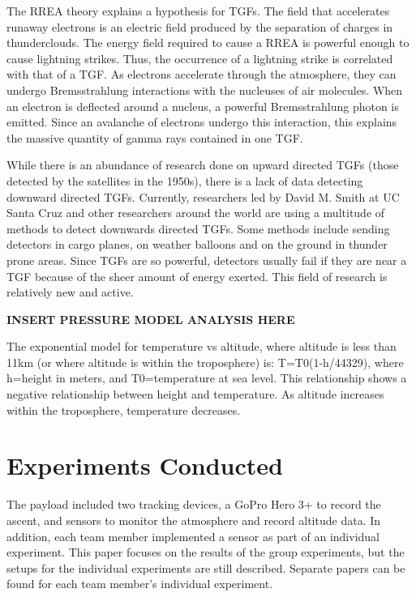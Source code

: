 \documentclass[12pt,]{article}
\begin{document}
The RREA theory explains a hypothesis for TGFs. The field that
accelerates runaway electrons is an electric field produced by the
separation of charges in thunderclouds. The energy field required to
cause a RREA is powerful enough to cause lightning strikes. Thus, the
occurrence of a lightning strike is correlated with that of a TGF. As
electrons accelerate through the atmosphere, they can undergo
Bremsstrahlung interactions with the nucleuses of air molecules. When an
electron is deflected around a nucleus, a powerful Bremsstrahlung photon
is emitted. Since an avalanche of electrons undergo this interaction,
this explains the massive quantity of gamma rays contained in one TGF.

While there is an abundance of research done on upward directed TGFs
(those detected by the satellites in the 1950s), there is a lack of data
detecting downward directed TGFs. Currently, researchers led by David M.
Smith at UC Santa Cruz and other researchers around the world are using
a multitude of methods to detect downwards directed TGFs. Some methods
include sending detectors in cargo planes, on weather balloons and on
the ground in thunder prone areas. Since TGFs are so powerful, detectors
usually fail if they are near a TGF because of the sheer amount of
energy exerted. This field of research is relatively new and active.

\textbf{INSERT PRESSURE MODEL ANALYSIS HERE}

The exponential model for temperature vs altitude, where altitude is
less than 11km (or where altitude is within the troposphere) is:
T=T0(1-h/44329), where h=height in meters, and T0=temperature at sea
level. This relationship shows a negative relationship between height
and temperature. As altitude increases within the troposphere,
temperature decreases.

\section{Experiments Conducted}\label{experiments-conducted}

The payload included two tracking devices, a GoPro Hero 3+ to record the
ascent, and sensors to monitor the atmosphere and record altitude data.
In addition, each team member implemented a sensor as part of an
individual experiment. This paper focuses on the results of the group
experiments, but the setups for the individual experiments are still
described. Separate papers can be found for each team member's
individual experiment.
\end{document}
